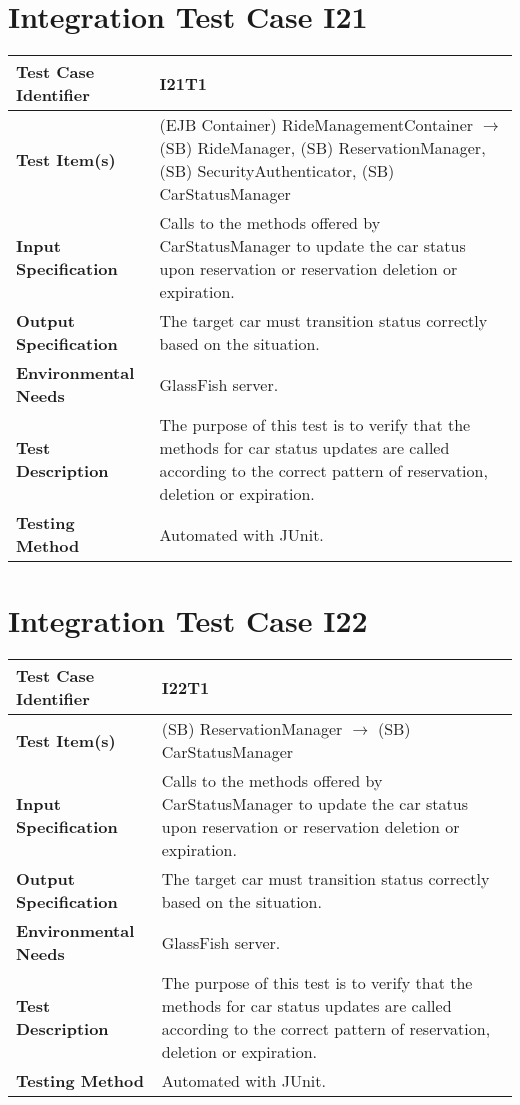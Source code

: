 \section{Integration Test Case I21}

\begin{longtable}{p{} | p{}}
\textbf{Test Case Identifier} & I21T1\\
\hline
\textbf{Test Item(s)} & (EJB Container) RideManagementContainer $\rightarrow$ (SB) RideManager, (SB) ReservationManager, (SB) SecurityAuthenticator, (SB) CarStatusManager \\
\hline
\textbf{Input Specification} & Calls to the methods offered by CarStatusManager to update the car status upon reservation or reservation deletion or expiration. \\
\hline
\textbf{Output Specification} & The target car must transition status correctly based on the situation. \\
\hline
\textbf{Environmental Needs} & GlassFish server. \\
\hline
\textbf{Test Description} & The purpose of this test is to verify that the methods for car status updates are called according to the correct pattern of reservation, deletion or expiration. \\
\hline
\textbf{Testing Method} & Automated with JUnit. \\
\hline
\end{longtable}

\section{Integration Test Case I22}

\begin{longtable}{p{} | p{}}
\textbf{Test Case Identifier} & I22T1\\
\hline
\textbf{Test Item(s)} & (SB) ReservationManager $\rightarrow$ (SB) CarStatusManager \\
\hline
\textbf{Input Specification} & Calls to the methods offered by CarStatusManager to update the car status upon reservation or reservation deletion or expiration. \\
\hline
\textbf{Output Specification} & The target car must transition status correctly based on the situation. \\
\hline
\textbf{Environmental Needs} & GlassFish server. \\
\hline
\textbf{Test Description} & The purpose of this test is to verify that the methods for car status updates are called according to the correct pattern of reservation, deletion or expiration. \\
\hline
\textbf{Testing Method} & Automated with JUnit. \\
\hline
\end{longtable}

